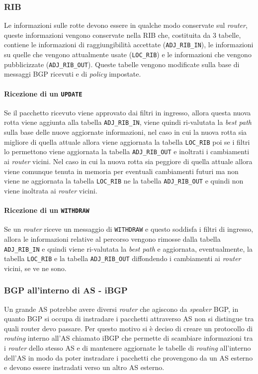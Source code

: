         \subsubsection{\acrfull*{RIB}}
            Le informazioni sulle rotte devono essere in qualche modo conservate sul \textit{router}, queste informazioni vengono conservate nella \acrshort*{RIB} che, costituita da 3 tabelle, contiene le informazioni di raggiungibilità accettate (\texttt{ADJ\_RIB\_IN}), le informazioni su quelle che vengono attualmente usate (\texttt{LOC\_RIB}) e le informazioni che vengono pubblicizzate (\texttt{ADJ\_RIB\_OUT}). Queste tabelle vengono modificate sulla base di messaggi \Acrshort*{BGP} ricevuti e di \textit{policy} impostate.
            \paragraph{Ricezione di un \texttt{UPDATE}} Se il pacchetto ricevuto viene approvato dai filtri in ingresso, allora questa nuova rotta viene aggiunta alla tabella \texttt{ADJ\_RIB\_IN}, viene quindi ri-valutata la \textit{best path} sulla base delle nuove aggiornate informazioni, nel caso in cui la nuova rotta sia migliore di quella attuale allora viene aggiornata la tabella \texttt{LOC\_RIB} poi se i filtri lo permettono viene aggiornata la tabella \texttt{ADJ\_RIB\_OUT} e inoltrati i cambiamenti ai \textit{router} vicini. Nel caso in cui la nuova rotta sia peggiore di quella attuale allora viene comunque tenuta in memoria per eventuali cambiamenti futuri ma non viene ne aggiornata la tabella \texttt{LOC\_RIB} ne la tabella \texttt{ADJ\_RIB\_OUT} e quindi non viene inoltrata ai \textit{router} vicini.
            \paragraph{Ricezione di un \texttt{WITHDRAW}} Se un \textit{router} riceve un messaggio di \texttt{WITHDRAW} e questo soddisfa i filtri di ingresso, allora le informazioni relative al percorso vengono rimosse dalla tabella \texttt{ADJ\_RIB\_IN} e quindi viene ri-valutata la \textit{best path} e aggiornata, eventualmente, la tabella \texttt{LOC\_RIB} e la tabella \texttt{ADJ\_RIB\_OUT} diffondendo i cambiamenti ai \textit{router} vicini, se ve ne sono.
        \subsubsection{\Acrshort*{BGP} all'interno di \Acrshort*{AS} - \Acrshort*{iBGP}}
            Un grande \Acrshort*{AS} potrebbe avere diversi \textit{router} che agiscono da \textit{speaker} \Acrshort*{BGP}, in quanto \Acrshort*{BGP} si occupa di instradare i pacchetti attraverso \Acrshort*{AS} non si distingue tra quali router devo passare. Per questo motivo si è deciso di creare un protocollo di \textit{routing} interno all'\Acrshort*{AS} chiamato \Acrshort*{iBGP} che permette di scambiare informazioni tra i \textit{router} dello stesso \Acrshort*{AS} e di mantenere aggiornate le tabelle di \textit{routing} all'interno dell'\Acrshort*{AS} in modo da poter instradare i pacchetti che provengono da un \Acrshort*{AS} esterno e devono essere instradati verso un altro \Acrshort*{AS} esterno.
